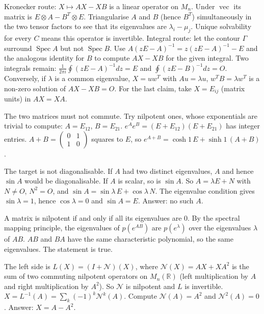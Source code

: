 \documentclass[11pt,a4paper]{article}
\begin{document}

Kronecker route: \(X\mapsto AX-XB\) is a linear operator on \(M_n\). Under \(\operatorname{vec}\) its matrix is \(E\otimes A-B^T\otimes E\). Triangularise \(A\) and \(B\) (hence \(B^T\)) simultaneously in the two tensor factors to see that its eigenvalues are \(\lambda_i-\mu_j\). Unique solvability for every \(C\) means this operator is invertible.
Integral route: let the contour \(\Gamma\) surround \(\operatorname{Spec}A\) but not \(\operatorname{Spec}B\). Use \(A(zE-A)^{-1}=z(zE-A)^{-1}-E\) and the analogous identity for \(B\) to compute \(AX-XB\) for the given integral. Two integrals remain: \(\frac1{2\pi i}\oint(zE-A)^{-1}dz=E\) and \(\oint(zE-B)^{-1}dz=O\).
Conversely, if \(\lambda\) is a common eigenvalue, \(X=uw^T\) with \(Au=\lambda u\), \(w^TB=\lambda w^T\) is a non-zero solution of \(AX-XB=O\). For the last claim, take \(X=E_{ij}\) (matrix units) in \(AX=XA\).

The two matrices must not commute. Try nilpotent ones, whose exponentials are trivial to compute: \(A=E_{12}\), \(B=E_{21}\).
\(e^Ae^B=(E+E_{12})(E+E_{21})\) has integer entries. \(A+B=\begin{pmatrix}0&1\\1&0\end{pmatrix}\) squares to \(E\), so \(e^{A+B}=\cosh1\,E+\sinh1\,(A+B)\).

The target is not diagonalisable. If \(A\) had two distinct eigenvalues, \(A\) and hence \(\sin A\) would be diagonalisable. If \(A\) is scalar, so is \(\sin A\).
So \(A=\lambda E+N\) with \(N\ne O\), \(N^2=O\), and \(\sin A=\sin\lambda\,E+\cos\lambda\,N\). The eigenvalue condition gives \(\sin\lambda=1\), hence \(\cos\lambda=0\) and \(\sin A=E\). Answer: no such \(A\).

A matrix is nilpotent if and only if all its eigenvalues are \(0\). By the spectral mapping principle, the eigenvalues of \(p(e^{AB})\) are \(p(e^{\lambda})\) over the eigenvalues \(\lambda\) of \(AB\).
\(AB\) and \(BA\) have the same characteristic polynomial, so the same eigenvalues. The statement is true.

The left side is \(L(X)=(I+\mathcal N)(X)\), where \(\mathcal N(X)=AX+XA^2\) is the sum of two commuting nilpotent operators on \(M_n(\mathbb R)\) (left multiplication by \(A\) and right multiplication by \(A^2\)). So \(\mathcal N\) is nilpotent and \(L\) is invertible.
\(X=L^{-1}(A)=\sum_k(-1)^k\mathcal N^k(A)\). Compute \(\mathcal N(A)=A^2\) and \(\mathcal N^2(A)=0\). Answer: \(X=A-A^2\).
\end{document}

